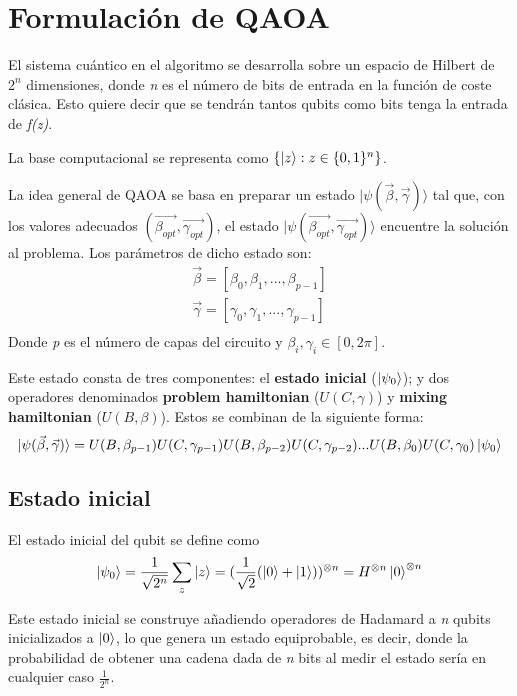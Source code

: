 \documentclass{article}
\begin{document}
\section{Formulación de QAOA}
El sistema cuántico en el algoritmo se desarrolla sobre un espacio de Hilbert de $2^n$ dimensiones, donde \textit{n} es el número de bits de entrada en la función de coste clásica. Esto quiere decir que se tendrán tantos qubits como bits tenga la entrada de \textit{f(z)}.

La base computacional se representa como $\{\ket{z} : z \in \{0, 1\}^n\}$.

La idea general de QAOA se basa en preparar un estado \(\lvert \psi(\vec{\beta}, \vec{\gamma})\rangle\) tal que, con los valores adecuados \( (\vec{\beta_{opt}}, \vec{\gamma_{opt}}) \), el estado \(\lvert\psi(\vec{\beta_{opt}}, \vec{\gamma_{opt}})\rangle\) encuentre la solución al problema. Los parámetros de dicho estado son:
\begin{align*}
  \vec{\beta} = [\beta_0, \beta_1, ..., \beta_{p-1}] \\
  \vec{\gamma} = [\gamma_0, \gamma_1, ..., \gamma_{p-1}] \\
\end{align*}
Donde \textit{p} es el número de capas del circuito y $\beta_i, \gamma_i \in{[0, 2\pi]}$.

Este estado consta de tres componentes: el \textbf{estado inicial} ($\ket{\psi_0}$); y dos operadores denominados \textbf{problem hamiltonian} ($U(C, \gamma)$) y \textbf{mixing hamiltonian} ($U(B, \beta)$).
Estos se combinan de la siguiente forma:
\[
  \lvert\psi(\vec{\beta}, \vec{\gamma})\rangle = U(B, \beta_{p-1})U(C, \gamma_{p-1})U(B, \beta_{p-2})U(C, \gamma_{p-2}) ... U(B, \beta_0)U(C, \gamma_0) \ket{\psi_0}
\]

\subsection{Estado inicial}
El estado inicial del qubit se define como
\begin{align*}
  \ket{\psi_0} = \frac{1}{\sqrt{2^n}} \sum_z\ket{z}
  = (\frac{1}{\sqrt{2}} (\ket{0} + \ket{1}))^{\otimes n}
  = H^{\otimes n} \ket{0}^{\otimes n}
\end{align*}

Este estado inicial se construye añadiendo operadores de Hadamard a \textit{n} qubits inicializados a $\ket{0}$, lo que genera un estado equiprobable, es decir, donde la probabilidad de obtener una cadena dada de \textit{n} bits al medir el estado sería en cualquier caso $\frac{1}{2^n}$.
\end{document}
